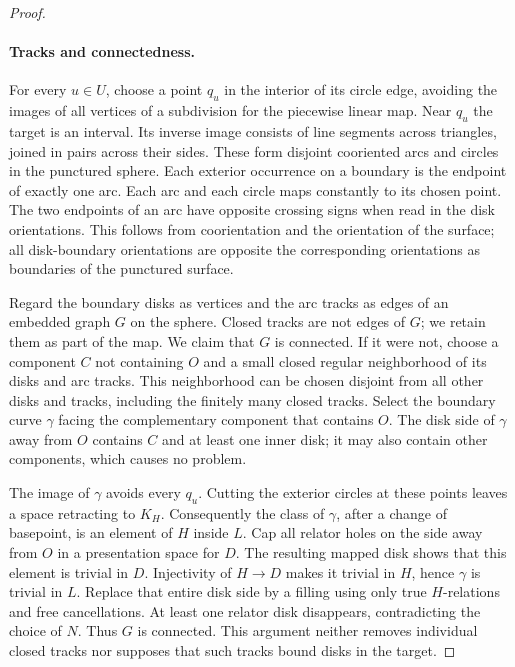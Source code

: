 \begin{proof}
\paragraph{Tracks and connectedness.}
For every $u\in U$, choose a point $q_u$ in the interior of its circle
edge, avoiding the images of all vertices of a subdivision for the
piecewise linear map.  Near $q_u$ the target is an interval.  Its inverse
image consists of line segments across triangles, joined in pairs
across their sides.  These form disjoint cooriented arcs and circles in
the punctured sphere.  Each exterior occurrence on a boundary is the
endpoint of exactly one arc.  Each arc and each circle maps constantly
to its chosen point.  The two endpoints of an arc have opposite
crossing signs when read in the disk orientations.  This follows from
coorientation and the orientation of the surface; all disk-boundary
orientations are opposite the corresponding orientations as boundaries
of the punctured surface.

Regard the boundary disks as vertices and the arc tracks as edges of
an embedded graph $G$ on the sphere.  Closed tracks are not edges of
$G$; we retain them as part of the map.  We claim that $G$ is connected.
If it were not, choose a component $C$ not containing $O$ and a small
closed regular neighborhood of its disks and arc tracks.  This
neighborhood can be chosen disjoint from all other disks and tracks,
including the finitely many closed tracks.  Select the boundary curve
$\gamma$ facing the complementary component that contains $O$.
The disk side of $\gamma$ away from $O$ contains $C$ and at least one
inner disk; it may also contain other components, which causes no
problem.

The image of $\gamma$ avoids every $q_u$.  Cutting the exterior circles
at these points leaves a space retracting to $K_H$.  Consequently the
class of $\gamma$, after a change of basepoint, is an element of $H$
inside $L$.  Cap all relator holes on the side away from $O$ in a
presentation space for $D$.  The resulting mapped disk shows that this
element is trivial in $D$.  Injectivity of $H\to D$ makes it trivial in
$H$, hence $\gamma$ is trivial in $L$.  Replace that entire disk side
by a filling using only true $H$-relations and free cancellations.
At least one relator disk disappears, contradicting the choice of $N$.
Thus $G$ is connected.  This argument neither removes individual closed
tracks nor supposes that such tracks bound disks in the target.


\end{proof}
